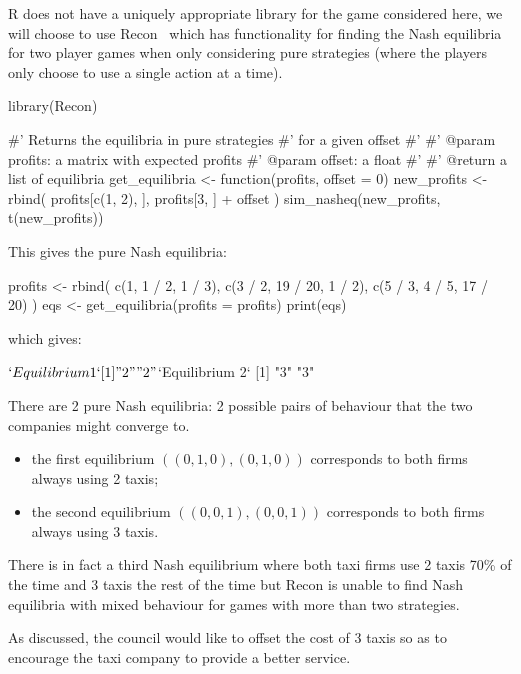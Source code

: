R does not have a uniquely appropriate library for the game considered here, we
will choose to use Recon~\cite{oliveira2019recon} which has
functionality for finding the Nash equilibria for two player games when only
considering pure strategies (where the players only choose to use a single
action at a time).

\begin{Rin}
library(Recon)

#' Returns the equilibria in pure strategies
#' for a given offset
#'
#' @param profits: a matrix with expected profits
#' @param offset: a float
#'
#' @return a list of equilibria
get_equilibria <- function(profits, offset = 0){
  new_profits <- rbind(
    profits[c(1, 2), ],
    profits[3, ] + offset
  )
  sim_nasheq(new_profits, t(new_profits))
}
\end{Rin}


This gives the pure Nash equilibria:

\begin{Rin}

profits <- rbind(
  c(1, 1 / 2, 1 / 3),
  c(3 / 2, 19 / 20, 1 / 2),
  c(5 / 3, 4 / 5, 17 / 20)
)
eqs <- get_equilibria(profits = profits)
print(eqs)
\end{Rin}

which gives:

\begin{Rout}
$`Equilibrium 1`
[1] "2" "2"

$`Equilibrium 2`
[1] "3" "3"

\end{Rout}

There are 2 pure Nash equilibria: 2 possible pairs of behaviour that the two
companies might converge to.

\begin{itemize}
    \item the first equilibrium \(((0, 1, 0), (0, 1, 0))\) corresponds to both
          firms always using 2 taxis;
    \item the second equilibrium \(((0, 0, 1), (0, 0, 1))\) corresponds to both
          firms always using 3 taxis.
\end{itemize}

There is in fact a third Nash equilibrium where both taxi firms use 2 taxis 70\%
of the time and 3 taxis the rest of the time but Recon is unable
to find Nash equilibria with mixed behaviour for games with more than two
strategies.

As discussed, the council would like to offset the cost of 3
taxis so as to encourage the taxi company to provide a better service.

